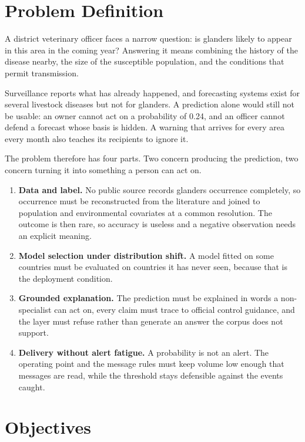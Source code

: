 \documentclass[10pt,openany]{report}
\begin{document}
\section{Problem Definition}

A district veterinary officer faces a narrow question: is glanders likely to appear in this area
in the coming year? Answering it means combining the history of the disease nearby, the size of
the susceptible population, and the conditions that permit transmission.

Surveillance reports what has already happened, and forecasting systems exist for several livestock
diseases but not for glanders. A prediction alone would still not be usable: an owner cannot act on a
probability of 0.24, and an officer cannot defend a forecast whose basis is hidden. A warning that
arrives for every area every month also teaches its recipients to ignore it.

The problem therefore has four parts. Two concern producing the prediction, two concern turning it
into something a person can act on.

\begin{enumerate}
  \item \textbf{Data and label.} No public source records glanders occurrence completely, so
        occurrence must be reconstructed from the literature and joined to population and
        environmental covariates at a common resolution. The outcome is then rare, so accuracy is
        useless and a negative observation needs an explicit meaning.
  \item \textbf{Model selection under distribution shift.} A model fitted on some countries must be
        evaluated on countries it has never seen, because that is the deployment condition.
  \item \textbf{Grounded explanation.} The prediction must be explained in words a non-specialist
        can act on, every claim must trace to official control guidance, and the layer must refuse
        rather than generate an answer the corpus does not support.
  \item \textbf{Delivery without alert fatigue.} A probability is not an alert. The operating point
        and the message rules must keep volume low enough that messages are read, while the
        threshold stays defensible against the events caught.
\end{enumerate}

\section{Objectives}
\end{document}
